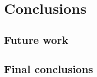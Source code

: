 \renewcommand{\documentname}{Conclusions}

\chapter{Conclusions}

\section{Future work}
\section{Final conclusions}

